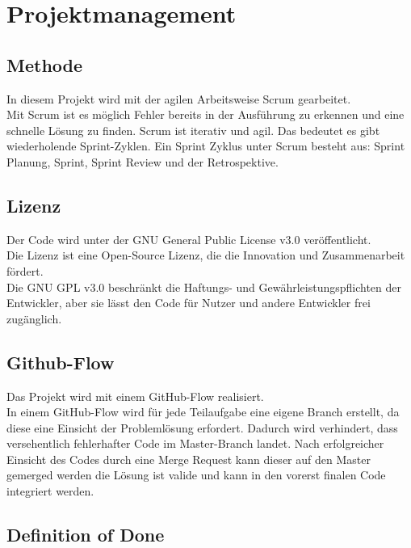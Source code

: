 \chapter{Projektmanagement}\label{ch:projektmanagement}

\section{Methode}\label{sec:methode}

In diesem Projekt wird mit der agilen Arbeitsweise Scrum gearbeitet.\\
Mit Scrum ist es möglich Fehler bereits in der Ausführung zu erkennen und eine schnelle Lösung zu finden.
Scrum ist iterativ und agil. Das bedeutet es gibt wiederholende Sprint-Zyklen.
Ein Sprint Zyklus unter Scrum besteht aus: Sprint Planung, Sprint, Sprint Review und der Retrospektive.

\section{Lizenz}\label{sec:lizenz}

Der Code wird unter der GNU General Public License v3.0 veröffentlicht.\\
Die Lizenz ist eine Open-Source Lizenz, die die Innovation und Zusammenarbeit fördert.\\
Die GNU GPL v3.0 beschränkt die Haftungs- und Gewährleistungspflichten der Entwickler, aber sie lässt den Code für Nutzer und andere Entwickler frei zugänglich.

\section{Github-Flow}\label{sec:github-flow}

Das Projekt wird mit einem GitHub-Flow realisiert.\\
In einem GitHub-Flow wird für jede Teilaufgabe eine eigene Branch erstellt, da diese eine Einsicht der Problemlösung erfordert.
Dadurch wird verhindert, dass versehentlich fehlerhafter Code im Master-Branch landet.
Nach erfolgreicher Einsicht des Codes durch eine Merge Request kann dieser auf den Master gemerged werden \dah{} die Lösung ist valide und kann in den vorerst finalen Code integriert werden.

\section{Definition of Done}\label{sec:dod}

